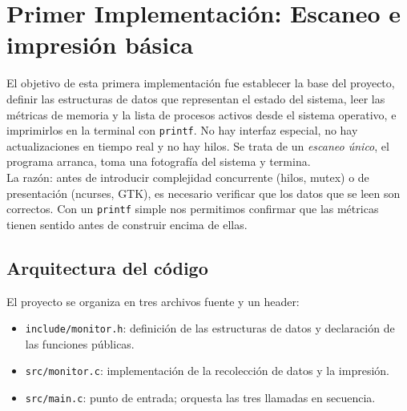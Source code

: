 \documentclass[12pt,letterpaper]{article}
\begin{document}
\newpage

\section*{Primer Implementación: Escaneo e impresión básica}

El objetivo de esta primera implementación fue establecer la base del proyecto, definir las estructuras de datos
que representan el estado del sistema, leer las métricas de memoria y la lista de procesos activos desde el
sistema operativo, e imprimirlos en la terminal con \texttt{printf}. No hay interfaz especial, no hay
actualizaciones en tiempo real y no hay hilos. Se trata de un \textit{escaneo único}, el programa arranca, toma
una fotografía del sistema y termina.\\
La razón: antes de introducir complejidad concurrente (hilos, mutex) o de presentación (ncurses, GTK), es
necesario verificar que los datos que se leen son correctos. Con un \texttt{printf} simple nos permitimos
confirmar que las métricas tienen sentido antes de construir encima de ellas.

\subsection*{Arquitectura del código}

El proyecto se organiza en tres archivos fuente y un header:
\begin{itemize}[leftmargin=1.5cm]
\item \texttt{include/monitor.h}: definición de las estructuras de datos y declaración de las funciones públicas.
\item \texttt{src/monitor.c}: implementación de la recolección de datos y la impresión.
\item \texttt{src/main.c}: punto de entrada; orquesta las tres llamadas en secuencia.
\end{itemize}

\medskip
\end{document}
